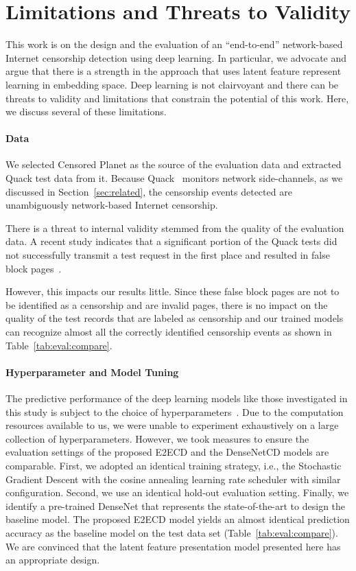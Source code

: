 \section{Limitations and Threats to Validity}
\label{sec:threats}

This work is on the design and the evaluation of an ``end-to-end''
network-based Internet censorship detection using deep learning. In particular,
we advocate and argue that there is a strength in the approach that uses latent
feature represent learning in embedding space. Deep learning is not clairvoyant
and there can be threats to validity and limitations that constrain the
potential of this work.  Here, we discuss several of these limitations.

\paragraph{Data}
We selected Censored Planet as the source of the evaluation data and extracted
Quack test data from it.  Because Quack~\cite{vandersloot2018quack,
raman_measuring_2020} monitors network side-channels, as we discussed in
Section~\ref{sec:related}, the censorship events detected are unambiguously
network-based Internet censorship.  

There is a threat to internal validity stemmed from the quality of the
evaluation data. A recent study indicates that a significant portion of the
Quack tests did not successfully transmit a test request in the first
place and resulted in false block pages~\cite{niaki2020iclab}. 

However, this impacts our results little. Since these false block pages are
not to be identified as a censorship and are invalid pages, there is no impact on the quality of the
test records that are labeled as censorship and our trained models can 
recognize almost all the correctly identified censorship events as shown
in Table~\ref{tab:eval:compare}. 


\paragraph{Hyperparameter and Model Tuning}
The predictive performance of the deep learning models like those investigated
in this study is subject to the choice of
hyperparameters~\cite{yang2020hyperparameter}. Due to the computation resources
available to us, we were unable to experiment exhaustively on a large
collection of hyperparameters. However, we took measures to ensure the evaluation 
settings of the proposed
E2ECD and the DenseNetCD models are comparable. First, we adopted an identical
training strategy, i.e., the Stochastic Gradient Descent with the cosine
annealing learning rate scheduler with similar configuration. Second, we use
an identical hold-out evaluation setting. Finally, we identify a pre-trained
DenseNet that represents the state-of-the-art to design the baseline 
model. The proposed E2ECD model yields an almost identical prediction
accuracy as the baseline model 
on the test data set (Table~\ref{tab:eval:compare}). We are convinced that the latent
feature presentation model presented here has an appropriate design. 

